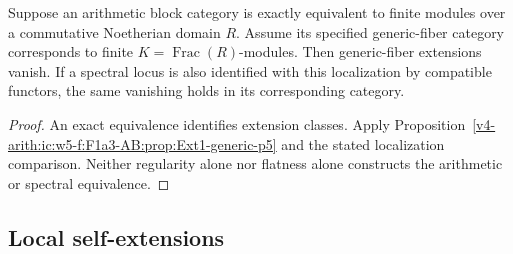 \begin{corollary}
\label{v4-arith:ic:w5-f:F1a3-AB:cor:Ext1-zero-generic-locus}
Suppose an arithmetic block category is exactly equivalent
to finite modules over a commutative Noetherian domain \(R\).
Assume its specified generic-fiber category corresponds to finite
\(K=\operatorname{Frac}(R)\)-modules.
Then generic-fiber extensions vanish. If a spectral locus is also
identified with this localization by compatible functors, the same
vanishing holds in its corresponding category.
\end{corollary}
\begin{proof}
An exact equivalence identifies extension classes. Apply
Proposition~\ref{v4-arith:ic:w5-f:F1a3-AB:prop:Ext1-generic-p5}
and the stated localization comparison. Neither regularity alone
nor flatness alone constructs the arithmetic or spectral equivalence.
\end{proof}

\subsection{Local self-extensions}

